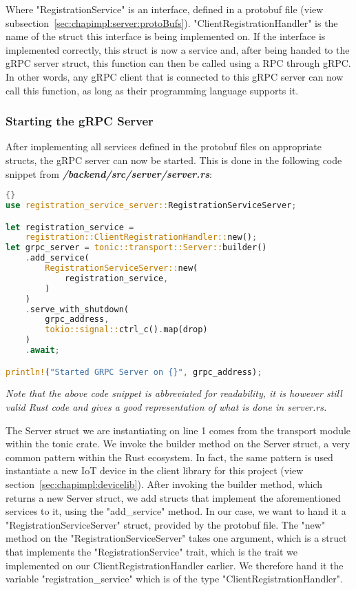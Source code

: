 Where "RegistrationService" is an interface, defined in a protobuf file (view subsection~\ref{sec:chapimpl:server:protoBufs}). "ClientRegistrationHandler" is the name of the struct this interface is being implemented on. If the interface is implemented correctly, this struct is now a service and, after being handed to the gRPC server struct, this function can then be called using a RPC through gRPC. In other words, any gRPC client that is connected to this gRPC server can now call this function, as long as their programming language supports it.

\subsubsection{Starting the gRPC Server}
After implementing all services defined in the protobuf files on appropriate structs, the gRPC server can now be started. This is done in the following code snippet from \textit{\textbf{/backend/src/server/server.rs}}:
\begin{lstlisting}[language=Rust, style=boxed, showstringspaces=false]{}
use registration_service_server::RegistrationServiceServer;

let registration_service =
    registration::ClientRegistrationHandler::new();
let grpc_server = tonic::transport::Server::builder()
    .add_service(
        RegistrationServiceServer::new(
            registration_service,
        )
    )
    .serve_with_shutdown(
        grpc_address,
        tokio::signal::ctrl_c().map(drop)
    )
    .await;

println!("Started GRPC Server on {}", grpc_address);
\end{lstlisting}
\textit{Note that the above code snippet is abbreviated for readability, it is however still valid Rust code and gives a good representation of what is done in server.rs.} 

The Server struct we are instantiating on line 1 comes from the transport module within the tonic crate. We invoke the builder method on the Server struct, a very common pattern within the Rust ecosystem. In fact, the same pattern is used instantiate a new IoT device in the client library for this project (view section~\ref{sec:chapimpl:devicelib}). After invoking the builder method, which returns a new Server struct, we add structs that implement the aforementioned services to it, using the "add\_service" method. In our case, we want to hand it a "RegistrationServiceServer" struct, provided by the protobuf file. The "new" method on the "RegistrationServiceServer" takes one argument, which is a struct that implements the "RegistrationService" trait, which is the trait we implemented on our ClientRegistrationHandler earlier. We therefore hand it the variable "registration\_service" which is of the type "ClientRegistrationHandler".

